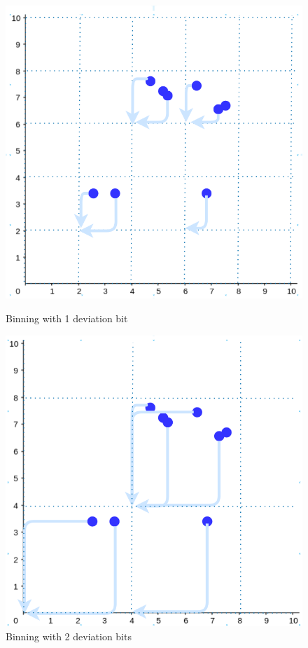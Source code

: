 \begin{figure}
  \centering
  \begin{minipage}{0.45\linewidth}
    \centering
    \includegraphics[width=\textwidth]{images/binning-1dev.png}
    \caption{Binning with 1 deviation bit}
    \label{fig:binning-1}
  \end{minipage}\hfill
  \begin{minipage}{0.45\linewidth}
    \centering
    \includegraphics[width=\textwidth]{images/binning-2dev.png}
    \caption{Binning with 2 deviation bits}
    \label{fig:binning-2}
  \end{minipage}
\end{figure}

